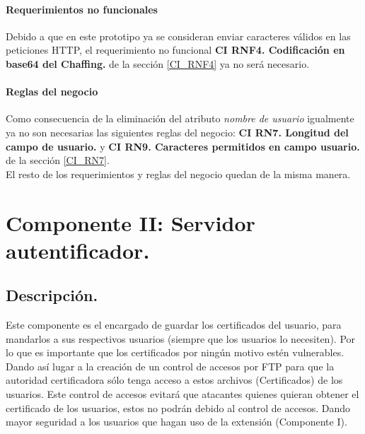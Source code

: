 \documentclass[12pt, a4paper, titlepage]{report}
\begin{document}
                \paragraph{Requerimientos no funcionales} Debido a que en este prototipo ya se consideran enviar caracteres válidos en las peticiones HTTP, el requerimiento no funcional  \textbf{CI RNF4. Codificación en base64 del Chaffing. } de la sección \ref{CI_RNF4} ya no será necesario.
                
                \paragraph{Reglas del negocio} Como consecuencia de la eliminación del atributo \textit{nombre de usuario} igualmente ya no son necesarias las siguientes reglas del negocio: \textbf{CI RN7. Longitud del campo de usuario.} y \textbf{CI RN9. Caracteres permitidos en campo usuario.} de la sección \ref{CI_RN7}. \\
                
                El resto de los requerimientos y reglas del negocio quedan de la misma manera.
		    
		    
	    \section{Componente II: Servidor autentificador.}
	        \subsection{Descripción.}
	        
	            Este componente es el encargado de guardar los certificados del usuario, para mandarlos a sus respectivos usuarios (siempre que los usuarios lo necesiten). Por lo que es importante que los certificados por ningún motivo estén vulnerables. Dando así lugar a la creación de un control de accesos por FTP para que la autoridad certificadora sólo tenga acceso a estos archivos (Certificados) de los usuarios. Este control de accesos evitará que atacantes quienes quieran obtener el certificado de los usuarios, estos no podrán debido al control de accesos. Dando mayor seguridad a los usuarios que hagan uso de la extensión (Componente I).
	            
\end{document}
